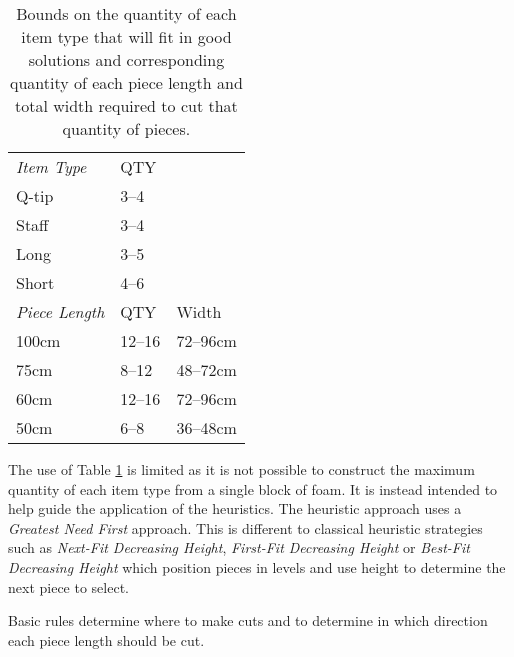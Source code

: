 \documentclass[10pt,a4paper]{article}
\begin{document}
\begin{table}
\centering
\begin{tabular}{l|ll}\hline
\textit{Item Type} & QTY&\\
Q-tip & 3--4&\\
Staff & 3--4&\\
Long & 3--5&\\
Short & 4--6&\\\hline
\textit{Piece Length} & QTY& Width\\
100cm & 12--16& 72--96cm\\
75cm & 8--12 & 48--72cm\\
60cm & 12--16 & 72--96cm\\
50cm & 6--8& 36--48cm\\\hline
\end{tabular}
\caption{Bounds on the quantity of each item type that will fit in good solutions and corresponding quantity of each piece length and total width required to cut that quantity of pieces.}
\label{tab:caplan}
\end{table}

The use of Table \ref{tab:caplan} is limited as it is not possible to construct the maximum quantity of each item type from a single block of foam. It is instead intended to help guide the application of the heuristics. The heuristic approach uses a \textit{Greatest Need First} approach.  This is different to classical heuristic strategies such as \textit{Next-Fit Decreasing Height}, \textit{First-Fit Decreasing Height} or \textit{Best-Fit Decreasing Height} which position pieces in levels and use height to determine the next piece to select.
 
Basic rules determine where to make cuts and to determine in which direction each piece length should be cut. 
\end{document}
